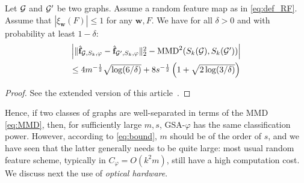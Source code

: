 \documentclass{article}
\begin{document}

\begin{theorem}\label{theorem:concentration}
Let $\mathcal{G}$ and $\mathcal{G}'$ be two graphs. %
Assume a random feature map as in \eqref{eq:def_RF}. Assume that $|\xi_\mathbf{w}(F)| \leq 1$ for any $\mathbf{w},F$.
We have for all $\delta>0$ and with probability at least $1-\delta$:
\begin{multline}\label{eq:bound}
\mathsmaller{
 \Big|\|\hat{\mathbf{f}}_{\G,S_k,\varphi} - \hat{\mathbf{f}}_{\G',S_k,\varphi} \|_2^2 - \textup{MMD}^2(S_k(\G),S_k(\G')) \Big| } \\
 \mathsmaller{ \leq 4 m^{-\frac12} \sqrt{\log (6/\delta)} + 8s^{-\frac12} \left(1+\sqrt{2\log(3/\delta)}\right)}
\end{multline}
\end{theorem}
\begin{proof}
	See the extended version of this article~\cite{arxiv_version}.
\end{proof}
Hence, if two classes of graphs are well-separated in terms of the MMD \eqref{eq:MMD}, then, for sufficiently large $m,s$, GSA-$\varphi$ has the same classification power. However, according to \eqref{eq:bound}, $m$ should be of the order of $s$, and we have seen that the latter generally needs to be quite large:  most usual random feature scheme, typically in $C_\varphi =O(k^2 m)$, still have a high computation cost. We discuss next the use of \emph{optical hardware}.
\end{document}
